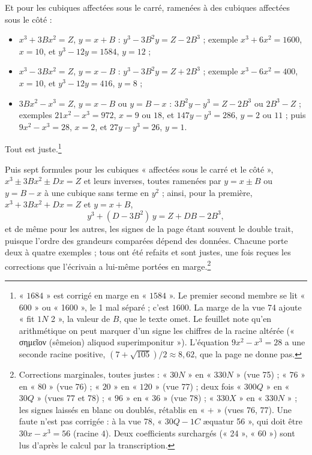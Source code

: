 \documentclass[11pt,a4paper]{article}
\begin{document}
Et pour les cubiques affectées sous le carré, ramenées à des cubiques
affectées sous le côté :
\begin{itemize}
  \item $x^3 + 3Bx^2 = Z$, $y = x + B$ : $y^3 - 3B^2y = Z - 2B^3$ ; exemple
    $x^3 + 6x^2 = 1600$, $x = 10$, et $y^3 - 12y = 1584$, $y = 12$ ;
  \item $x^3 - 3Bx^2 = Z$, $y = x - B$ : $y^3 - 3B^2y = Z + 2B^3$ ; exemple
    $x^3 - 6x^2 = 400$, $x = 10$, et $y^3 - 12y = 416$, $y = 8$ ;
  \item $3Bx^2 - x^3 = Z$, $y = x - B$ ou $y = B - x$ :
    $3B^2y - y^3 = Z - 2B^3$ ou $2B^3 - Z$ ; exemples $21x^2 - x^3 = 972$,
    $x = 9$ ou $18$, et $147y - y^3 = 286$, $y = 2$ ou $11$ ; puis
    $9x^2 - x^3 = 28$, $x = 2$, et $27y - y^3 = 26$, $y = 1$.
\end{itemize}
Tout est juste.\footnote{« $1684$ » est corrigé en marge en « $1584$ ». Le premier
second membre se lit « 600 » ou « 1600 », le 1 mal séparé ; c'est $1600$. La
marge de la vue 74 ajoute « fit $1N$ 2 », la valeur de $B$, que le texte omet. Le
feuillet note qu'en arithmétique on peut marquer d'un signe les chiffres de la
racine altérée (« σημεῖον (sêmeion) aliquod superimponitur »). L'équation
$9x^2 - x^3 = 28$ a une seconde racine positive, $(7 + \sqrt{105})/2 \approx
8{,}62$, que la page ne donne pas.}

Puis sept formules pour les cubiques « affectées sous le carré et le côté »,
$x^3 \pm 3Bx^2 \pm Dx = Z$ et leurs inverses, toutes ramenées par $y = x \pm B$
ou $y = B - x$ à une cubique sans terme en $y^2$ ; ainsi, pour la première,
$x^3 + 3Bx^2 + Dx = Z$ et $y = x + B$,
\[ y^3 + (D - 3B^2)\,y = Z + DB - 2B^3 , \]
et de même pour les autres, les signes de la page étant souvent le double trait,
puisque l'ordre des grandeurs comparées dépend des données. Chacune porte deux à quatre
exemples ; tous ont été refaits et sont justes, une fois reçues les corrections
que l'écrivain a lui-même portées en marge.\footnote{Corrections marginales, toutes
justes : « $30N$ » en « $330N$ » (vue 75) ; « $76$ » en « $80$ » (vue 76) ; « $20$ »
en « $120$ » (vue 77) ; deux fois « $300Q$ » en « $30Q$ » (vues 77 et 78) ;
« $96$ » en « $36$ » (vue 78) ; « $330X$ » en « $330N$ » ; les signes laissés en
blanc ou doublés, rétablis en « $+$ » (vues 76, 77). Une faute n'est pas
corrigée : à la vue 78, « $30Q - 1C$ æquatur 56 », qui doit être $30x - x^3 = 56$
(racine $4$). Deux coefficients surchargés (« 24 », « 60 ») sont lus d'après le
calcul par la transcription.}
\end{document}
